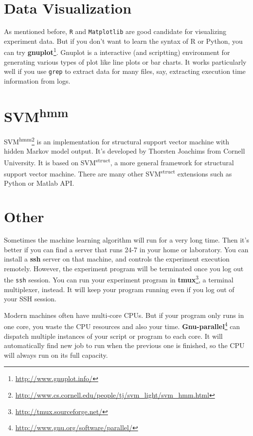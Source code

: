 \section*{Data Visualization}
As mentioned before, \texttt{R} and \texttt{Matplotlib} are good candidate for visualizing experiment data. But if you don't want to learn the syntax of R or Python, you can try \textbf{gnuplot}\footnote{\url{http://www.gnuplot.info/}}. Gnuplot is a interactive (and scriptting) environment for generating various types of plot like line plots or bar charts. It works particularly well if you use \texttt{grep} to extract data for many files, say, extracting execution time information from logs.

\section*{SVM\textsuperscript{hmm}}
SVM\textsuperscript{hmm}\footnote{\url{http://www.cs.cornell.edu/people/tj/svm_light/svm_hmm.html}} is an implementation for structural support vector machine with hidden Markov model output. It's developed by Thorsten Joachims from Cornell University. It is based on SVM\textsuperscript{struct}, a more general framework for structural support vector machine. There are many other SVM\textsuperscript{struct} extensions such as Python or Matlab API.
   

\section*{Other}
Sometimes the machine learning algorithm will run for a very long time. Then it's better if you can find a server that runs 24-7 in your home or laboratory. You can install a \textbf{ssh} server on that machine, and controls the experiment execution remotely. However, the experiment program will be terminated once you log out the \texttt{ssh} session. You can run your experiment program in \textbf{tmux}\footnote{\url{http://tmux.sourceforge.net/}}, a terminal multiplexer, instead. It will keep your program running even if you log out of your SSH session.

Modern machines often have multi-core CPUs. But if your program only runs in one core, you waste the CPU resources and also your time. \textbf{Gnu-parallel}\footnote{\url{http://www.gnu.org/software/parallel/}} can dispatch multiple instances of your script or program to each core. It will automatically find new job to run when the previous one is finished, so the CPU will always run on its full capacity. 

